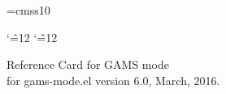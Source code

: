 \documentclass{article}
\begin{document}
\setlength{\columnsep}{1cm}

\twocolumn\footnotesize\pagestyle{empty}

\def\version{6.0}
\def\date{March, 2016}
\def\year{2001--2016\ }

\def\author{Shiro Takeda \\{\tt shiro.takeda@gmail.com}}

\raggedbottom\raggedright

\newenvironment{keys}[1]%
  {\noindent
   \settowidth{\keycolwidth}{#1}%
   \addtolength{\keycolwidth}{\tabcolsep}%
   \addtolength{\keycolwidth}{-\columnwidth}%
   \begin{tabular}{@{}l@{\hspace{\tabcolsep}}p{-\keycolwidth}@{}}}%
  {\end{tabular}\\}

\newdimen{} {}\hsize
\def\hang{\hangindent\defwidth}
\def\textindent#1{\noindent\llap{\hbox to \defwidth{\tt#1\hfil}}\ignorespaces}
\def\key{\par\hangafter=0\hang\textindent}

\font\headingfont=cmss10
\def\sec#1{\par
  \vskip 3ex plus 2ex minus 2ex
  {\headingfont #1}\mark{#1}%
  \vskip 2ex plus 1ex minus 1.5ex}

\catcode`\^=12 %
\catcode`\~=12 %

\newcommand{\B}[1]{{\bf#1})}    %
\newcommand{\kbd}[1]{{\tt#1}}

\def\cr{
\begin{center}
Copyright \copyright \ \year \ \author.\vspace*{1em}\\

Permission is granted to make and distribute copies of this card
provided the copyright notice and this permission notice are preserved
on all copies.
\end{center}
}



\begin{center}
 {\sf
 {\large Reference Card for GAMS mode} \vspace*{0.5em}\\
 {\small for gams-mode.el version \version, \date.}
 }
\end{center}
\end{document}
